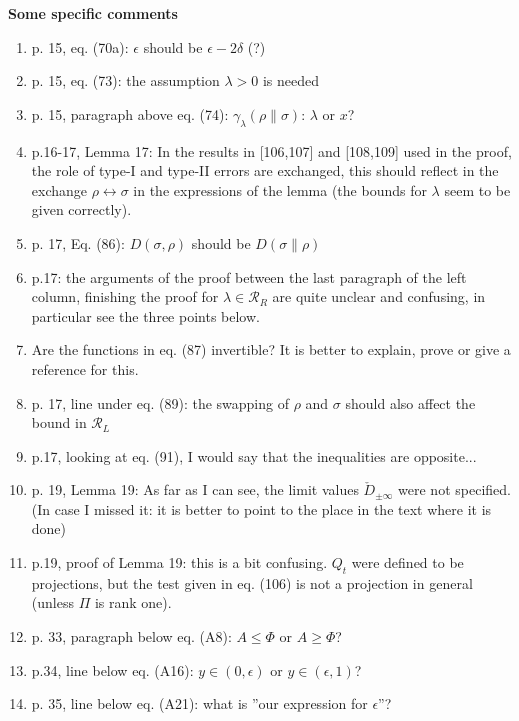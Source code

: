 \documentclass[12pt]{article}
\begin{document}
\medskip

\noindent
\textbf{Some specific comments}

\begin{enumerate}
\item p. 15, eq. (70a):  $\epsilon$ should be $\epsilon -2\delta$ (?)
\item p. 15, eq. (73): the assumption $\lambda>0$ is needed
\item p. 15, paragraph above eq. (74): $\gamma_\lambda(\rho\|\sigma)$: $\lambda$ or $x$?
\item p.16-17, Lemma 17: In the results in [106,107] and [108,109] used in the proof, the
role of type-I  and type-II errors are exchanged, this should reflect in the exchange
$\rho\leftrightarrow \sigma$ in the expressions of the lemma (the bounds for $\lambda$
seem to be given correctly).
\item p. 17, Eq. (86): $D(\sigma,\rho)$ should be $D(\sigma\|\rho)$
\item p.17: the arguments of the proof between the last paragraph of the left column,
finishing the proof for $\lambda\in \mathcal R_R$ are quite unclear and confusing, in
particular see the three points below.
\item  Are the functions in eq. (87) invertible? It is better to explain, prove or give a
reference for this.

\item p. 17, line under eq. (89): the swapping of $\rho$ and $\sigma$ should also affect
the bound in $\mathcal R_L$
\item p.17, looking at eq. (91), I would say that the inequalities are opposite...

\item p. 19, Lemma 19: As far as I can see, the limit values $\check{D}_{\pm\infty}$ were not
specified. (In case I missed it: it is better to point to the place in the
text where it is done)

\item p.19, proof of Lemma 19: this is a bit confusing. $Q_t$ were defined to be projections,
but the test given in eq. (106) is not a projection in general (unless $\Pi$ is rank one).

\item p. 33, paragraph below eq. (A8): $A\le \Phi$ or $A\ge \Phi$?
\item p.34, line below eq. (A16): $y\in (0,\epsilon)$ or $y\in (\epsilon,1)$?
\item p. 35, line below eq. (A21): what is ''our expression for $\epsilon$''?
\end{enumerate}
\medskip
\end{document}
